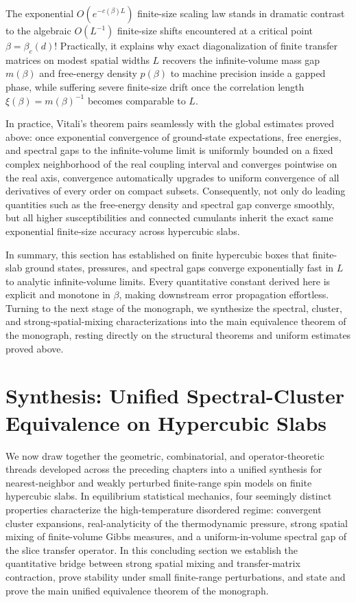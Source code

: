 \documentclass[11pt]{article}
\theoremstyle{definition}
\begin{document}
The exponential $O(e^{-c(\beta) L})$ finite-size scaling law stands in dramatic
contrast to the algebraic $O(L^{-1})$ finite-size shifts encountered at a critical
point $\beta = \beta_c(d)$! Practically, it explains why exact diagonalization of
finite transfer matrices on modest spatial widths $L$ recovers the infinite-volume
mass gap $m(\beta)$ and free-energy density $p(\beta)$ to machine precision inside a
gapped phase, while suffering severe finite-size drift once the correlation length
$\xi(\beta) = m(\beta)^{-1}$ becomes comparable to $L$.

In practice, Vitali's theorem pairs seamlessly with the global estimates proved
above: once exponential convergence of ground-state expectations, free energies, and
spectral gaps to the infinite-volume limit is uniformly bounded on a fixed complex
neighborhood of the real coupling interval and converges pointwise on the real axis,
convergence automatically upgrades to uniform convergence of all derivatives of
every order on compact subsets. Consequently, not only do leading quantities such as
the free-energy density and spectral gap converge smoothly, but all higher
susceptibilities and connected cumulants inherit the exact same exponential
finite-size accuracy across hypercubic slabs.

In summary, this section has established on finite hypercubic boxes that finite-slab
ground states, pressures, and spectral gaps converge exponentially fast in $L$ to
analytic infinite-volume limits. Every quantitative constant derived here is
explicit and monotone in $\beta$, making downstream error propagation effortless.
Turning to the next stage of the monograph, we synthesize the spectral, cluster, and
strong-spatial-mixing characterizations into the main equivalence theorem of the
monograph, resting directly on the structural theorems and uniform estimates proved
above.

\section{Synthesis: Unified Spectral-Cluster Equivalence on Hypercubic Slabs}
\label{sec:s10}

We now draw together the geometric, combinatorial, and operator-theoretic threads
developed across the preceding chapters into a unified synthesis for
nearest-neighbor and weakly perturbed finite-range spin models on finite hypercubic
slabs. In equilibrium statistical mechanics, four seemingly distinct properties
characterize the high-temperature disordered regime: convergent cluster expansions,
real-analyticity of the thermodynamic pressure, strong spatial mixing of
finite-volume Gibbs measures, and a uniform-in-volume spectral gap of the slice
transfer operator. In this concluding section we establish the quantitative bridge
between strong spatial mixing and transfer-matrix contraction, prove stability under
small finite-range perturbations, and state and prove the main unified equivalence
theorem of the monograph.
\end{document}
